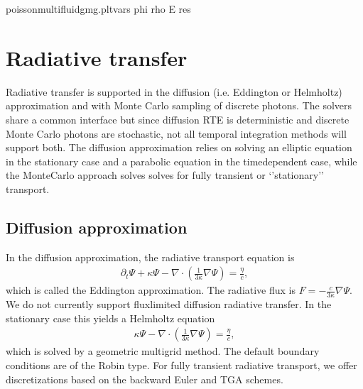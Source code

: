 \documentclass[letterpaper,10pt,english]{sphinxmanual}
\begin{document}
\begin{sphinxVerbatim}[commandchars=\\\{\},formatcom=\scriptsize]
poisson\PYGZus{}multifluid\PYGZus{}gmg.plt\PYGZus{}vars   phi rho E res     
\end{sphinxVerbatim}


\section{Radiative transfer}
\label{\detokenize{RTE:radiative-transfer}}\label{\detokenize{RTE:chap-radiativetransfer}}\label{\detokenize{RTE::doc}}
Radiative transfer is supported in the diffusion (i.e. Eddington or Helmholtz) approximation and with Monte Carlo sampling of discrete photons.
The solvers share a common interface but since diffusion RTE is deterministic and discrete Monte Carlo photons are stochastic, not all temporal integration methods will support both.
The diffusion approximation relies on solving an elliptic equation in the stationary case and a parabolic equation in the time\sphinxhyphen{}dependent case, while the Monte\sphinxhyphen{}Carlo approach solves solves for fully transient or ‘’stationary’’ transport.


\subsection{Diffusion approximation}
\label{\detokenize{RTE:diffusion-approximation}}
In the diffusion approximation, the radiative transport equation is
\begin{equation*}
\begin{split}\partial_t\Psi + \kappa\Psi - \nabla\cdot\left(\frac{1}{3\kappa}\nabla\Psi\right) = \frac{\eta}{c},\end{split}
\end{equation*}
which is called the Eddington approximation. The radiative flux is \(F = -\frac{c}{3\kappa}\nabla \Psi\).
We do not currently support flux\sphinxhyphen{}limited diffusion radiative transfer.
In the stationary case this yields a Helmholtz equation
\begin{equation*}
\begin{split}\kappa\Psi - \nabla\cdot\left(\frac{1}{3\kappa}\nabla\Psi\right) = \frac{\eta}{c},\end{split}
\end{equation*}
which is solved by a geometric multigrid method. The default boundary conditions are of the Robin type.
For fully transient radiative transport, we offer discretizations based on the backward Euler and TGA schemes.
\end{document}
